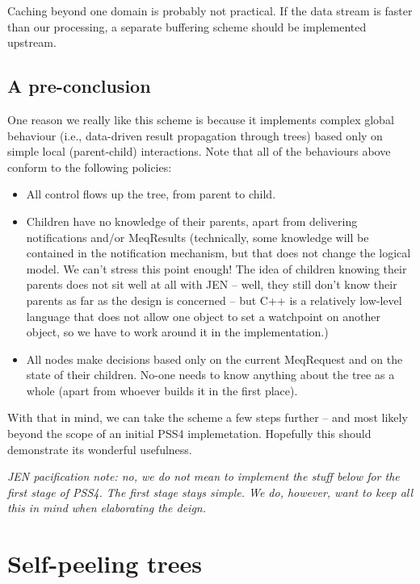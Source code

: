 \documentclass[12pt]{article}
\begin{document}
  Caching beyond one domain is probably not practical. If the data stream is
  faster than our processing, a separate buffering scheme should be implemented
  upstream.

\subsection{A pre-conclusion}

  One reason we really like this scheme is because it implements complex global
  behaviour (i.e., data-driven result propagation through trees) based only on
  simple local (parent-child) interactions. Note that all of the behaviours
  above conform to the following policies:
  
  \begin{itemize}
  
  \item All control flows up the tree, from parent to child.
  
  \item Children have no knowledge of their parents, apart from delivering
  notifications and/or MeqResults (technically, some knowledge will be
  contained in the notification mechanism, but that does not change the logical
  model. We can't stress this point enough! The idea of children knowing their
  parents does not sit well at all with JEN -- well, they still don't know
  their parents as far as the design is concerned -- but C++ is a relatively
  low-level language that does not allow one object to set a watchpoint on
  another object, so we have to work around it in the implementation.)

  \item All nodes make decisions based only on the current MeqRequest and on
  the state of their children. No-one needs to know anything about the tree as
  a whole (apart from whoever builds it in the first place).

  \end{itemize}
  
  With that in mind, we can take the scheme a few steps further -- and most
  likely beyond the scope of an initial PSS4 implemetation. Hopefully this
  should demonstrate its wonderful usefulness.
  
  {\em JEN pacification note: no, we do not mean to implement the stuff below
  for the first stage of PSS4. The first stage stays simple. We do, however,
  want to keep all this in mind when elaborating the deign.}
  
\section{Self-peeling trees}
\end{document}
